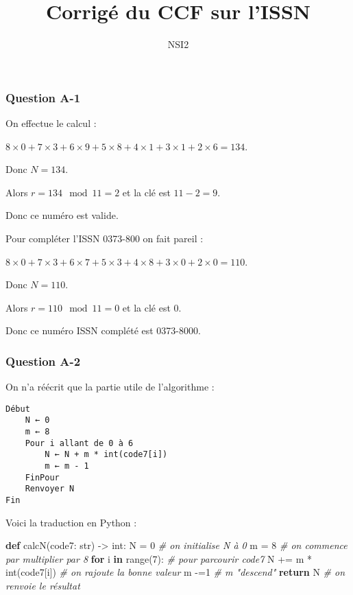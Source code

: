 \documentclass[
  12pt,
  a4paper,
]{article}
\title{Corrigé du CCF sur l'ISSN}
\author{NSI2}
\date{}
\newenvironment{Shaded}{}{}
\newcommand{\BuiltInTok}[1]{#1}
\newcommand{\CommentTok}[1]{\textcolor[rgb]{0.38,0.63,0.69}{\textit{#1}}}
\newcommand{\ControlFlowTok}[1]{\textcolor[rgb]{0.00,0.44,0.13}{\textbf{#1}}}
\newcommand{\DecValTok}[1]{\textcolor[rgb]{0.25,0.63,0.44}{#1}}
\newcommand{\KeywordTok}[1]{\textcolor[rgb]{0.00,0.44,0.13}{\textbf{#1}}}
\newcommand{\NormalTok}[1]{#1}
\newcommand{\OperatorTok}[1]{\textcolor[rgb]{0.40,0.40,0.40}{#1}}
\begin{document}
\maketitle

\hypertarget{question-a-1}{%
\subsubsection{Question A-1}\label{question-a-1}}

On effectue le calcul :

\(8\times 0+7\times 3+6\times 9+5\times 8+4\times 1+3\times 1+2\times 6 = 134\).

Donc \(N=134\).

Alors \(r=134\mod 11 = 2\) et la clé est \(11-2=9\).

Donc ce numéro est valide.

Pour compléter l'ISSN 0373-800 on fait pareil :

\(8\times 0+7\times 3+6\times 7+5\times 3+4\times 8+3\times 0+2\times 0 = 110\).

Donc \(N=110\).

Alors \(r=110\mod 11 = 0\) et la clé est \(0\).

Donc ce numéro ISSN complété est 0373-8000.

\hypertarget{question-a-2}{%
\subsubsection{Question A-2}\label{question-a-2}}

On n'a réécrit que la partie utile de l'algorithme :

\begin{verbatim}
Début
    N ← 0
    m ← 8
    Pour i allant de 0 à 6
        N ← N + m * int(code7[i])
        m ← m - 1
    FinPour
    Renvoyer N
Fin
\end{verbatim}

Voici la traduction en Python :

\begin{Shaded}
\begin{Highlighting}[]
\KeywordTok{def}\NormalTok{ calcN(code7: }\BuiltInTok{str}\NormalTok{) }\OperatorTok{{-}\textgreater{}} \BuiltInTok{int}\NormalTok{:}
\NormalTok{    N }\OperatorTok{=} \DecValTok{0} \CommentTok{\# on initialise N à 0}
\NormalTok{    m }\OperatorTok{=} \DecValTok{8} \CommentTok{\# on commence par multiplier par 8}
    \ControlFlowTok{for}\NormalTok{ i }\KeywordTok{in} \BuiltInTok{range}\NormalTok{(}\DecValTok{7}\NormalTok{):  }\CommentTok{\# pour parcourir code7}
\NormalTok{        N }\OperatorTok{+=}\NormalTok{ m }\OperatorTok{*} \BuiltInTok{int}\NormalTok{(code7[i])  }\CommentTok{\# on rajoute la bonne valeur}
\NormalTok{        m }\OperatorTok{{-}=}\DecValTok{1} \CommentTok{\# m "descend"}
    \ControlFlowTok{return}\NormalTok{ N }\CommentTok{\# on renvoie le résultat}
\end{Highlighting}
\end{Shaded}
\end{document}
